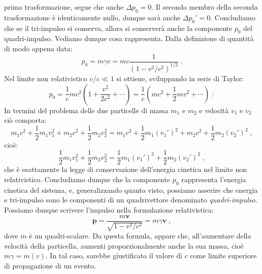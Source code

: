 prima trasformazione, segue che anche $\Delta p_0=0$. Il secondo membro della seconda trasformazione è identicamente nullo, dunque sarà anche $\Delta p_0'=0$. Concludiamo che se il tri-impulso si conserva, allora si conserverà anche la componente $p_0$ del 
quadri-impulso. Vediamo dunque cosa rappresenta. Dalla definizione di quantità di modo appena data:
\begin{equation}
p_0=m\gamma c=mc\frac{1}{\left(1-v^2/c^2\right)^{1/2}}\;.
\end{equation}
Nel limite non relativistico $v/c\ll 1$ si ottiene, sviluppando in serie di Taylor:
\begin{equation}
p_0=\frac{1}{c}mc^2\left(1+\frac{v^2}{2c^2}+\cdots\right)=\frac{1}{c}\left(mc^2+\frac{1}{2}mv^2+\cdots\right)\;:
\end{equation}
In termini del problema delle due particelle di massa $m_1$ e $m_2$ e velocità $v_1$ e $v_2$ ciò comporta:
\begin{equation}
m_1c^2+\frac{1}{2}m_1v_1^2+m_2c^2+\frac{1}{2}m_2v^2_2=m_1c^2+\frac{1}{2}m_1(v_1')^2+m_2c^2+\frac{1}{2}m_2(v_2')^2\;,
\end{equation}
cioè:
\begin{equation}
\frac{1}{2}m_1v_1^2+\frac{1}{2}m_2v_2^2=\frac{1}{2}m_1(v_1')^2+\frac{1}{2}m_2(v_2')^2\;,
\end{equation}
che è esattamente la legge di conservazione dell'energia cinetica nel limite non relativistico. Concludiamo dunque che la componente 
$p_0$ rappresenta l'energia cinetica del sistema, e, generalizzando quanto visto, possiamo asserire che energia e tri-impulso sono le 
componenti di un quadrivettore denominato \textit{quadri-impulso}. Possiamo dunque scrivere l'impulso nella formulazione relativistica:
\begin{equation}
 \mathbf{p}=\frac{m\mathbf{v}}{\sqrt{1-v^2/c^2}}=m\gamma\mathbf{v}\;, \label{ch4_relativistic3mom}
\end{equation}
dove $m$ è un quadri-scalare. Da questa formula, appare che, all'aumentare della velocità della particella, aumenti proporzionalmente 
anche la sua massa, cioè $m\gamma=m(v)$. In tal caso, sarebbe giustificato il valore di $c$ come limite superiore di propagazione di un 
evento.
